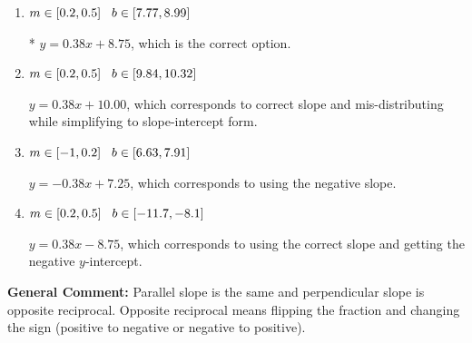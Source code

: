 \documentclass{extbook}[14pt]
\begin{document}
\begin{enumerate}
{\begin{enumerate}[label=\Alph*.]
 $y = 2.67x + 8.75$, which corresponds to using the reciprocal slope $(1/m)$.
\item \( m \in [0.2, 0.5] \hspace*{3mm} b \in [7.77, 8.99] \)

* $y = 0.38x + 8.75$, which is the correct option.
\item \( m \in [0.2, 0.5] \hspace*{3mm} b \in [9.84, 10.32] \)

 $y = 0.38x + 10.00$, which corresponds to correct slope and mis-distributing while simplifying to slope-intercept form.
\item \( m \in [-1, 0.2] \hspace*{3mm} b \in [6.63, 7.91] \)

 $y = -0.38x + 7.25$, which corresponds to using the negative slope.
\item \( m \in [0.2, 0.5] \hspace*{3mm} b \in [-11.7, -8.1] \)

 $y = 0.38x - 8.75$, which corresponds to using the correct slope and getting the negative $y$-intercept.
\end{enumerate}

\textbf{General Comment:} Parallel slope is the same and perpendicular slope is opposite reciprocal. Opposite reciprocal means flipping the fraction and changing the sign (positive to negative or negative to positive).
}
\end{enumerate}
\end{document}
